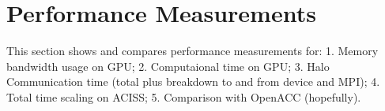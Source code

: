 \section{Performance Measurements}

This section shows and compares performance measurements for: 1. Memory bandwidth usage on GPU; 2. Computaional time on GPU; 3. Halo Communication time (total plus breakdown to and from device and MPI); 4. Total time scaling on ACISS; 5. Comparison with OpenACC (hopefully).


